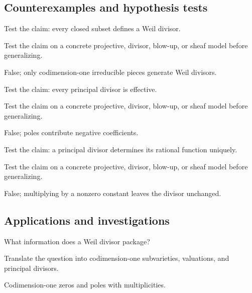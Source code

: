 \subsection*{Counterexamples and hypothesis tests}

\begin{exercise}\label{exr:vi39-expand-10}
Test the claim: every closed subset defines a Weil divisor.
\end{exercise}
\begin{hint}
Test the claim on a concrete projective, divisor, blow-up, or sheaf model before generalizing.
\end{hint}
\begin{solution}
False; only codimension-one irreducible pieces generate Weil divisors.
\end{solution}

\begin{exercise}\label{exr:vi39-expand-11}
Test the claim: every principal divisor is effective.
\end{exercise}
\begin{hint}
Test the claim on a concrete projective, divisor, blow-up, or sheaf model before generalizing.
\end{hint}
\begin{solution}
False; poles contribute negative coefficients.
\end{solution}

\begin{exercise}\label{exr:vi39-expand-12}
Test the claim: a principal divisor determines its rational function uniquely.
\end{exercise}
\begin{hint}
Test the claim on a concrete projective, divisor, blow-up, or sheaf model before generalizing.
\end{hint}
\begin{solution}
False; multiplying by a nonzero constant leaves the divisor unchanged.
\end{solution}

\subsection*{Applications and investigations}

\begin{exercise}\label{exr:vi39-expand-13}
What information does a Weil divisor package?
\end{exercise}
\begin{hint}
Translate the question into codimension-one subvarieties, valuations, and principal divisors.
\end{hint}
\begin{solution}
Codimension-one zeros and poles with multiplicities.
\end{solution}

